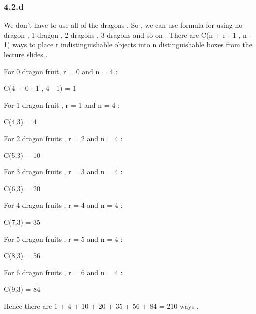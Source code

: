 \documentclass[12pt]{article}
\begin{document}
\subsubsection*{4.2.d} 
\hspace{15px} We don't have to use all of the dragons . So , we can use formula for using no dragon , 1 dragon , 2 dragons , 3 dragons and so on . There are C(n + r - 1 , n - 1) ways to place r indistinguishable objects into n distinguishable boxes from the lecture slides . \\ \par 
For 0 dragon fruit, r = 0 and n = 4 : \par 
C(4 + 0 - 1 , 4 - 1) = 1 \par 
For 1 dragon fruit , r = 1 and n = 4 : \par 
C(4,3) = 4 \par 
For 2 dragon fruits , r = 2 and n = 4 : \par 
C(5,3) = 10 \par 
For 3 dragon fruits , r = 3 and n = 4 : \par 
C(6,3) = 20 \par 
For 4 dragon fruits , r = 4 and n = 4 : \par 
C(7,3) = 35 \par 
For 5 dragon fruits , r = 5 and n = 4 : \par 
C(8,3) = 56 \par 
For 6 dragon fruits , r = 6 and n = 4 : \par 
C(9,3) = 84 \par 
Hence there are 1 + 4 + 10 + 20 + 35 + 56 + 84 = 210 ways .
\end{document}
